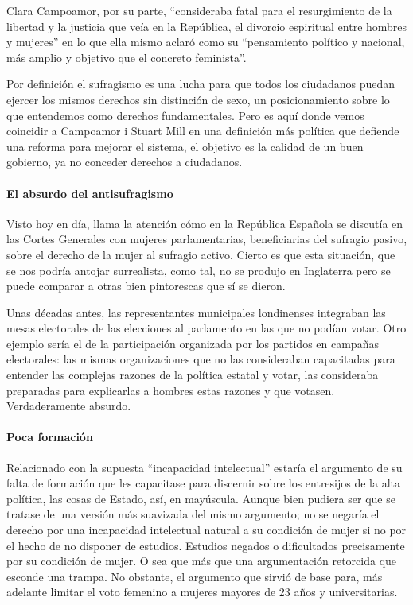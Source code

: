 \documentclass[
]{article}
\begin{document}
Clara Campoamor, por su parte, ``consideraba fatal para el resurgimiento
de la libertad y la justicia que veía en la República, el divorcio
espiritual entre hombres y mujeres'' en lo que ella mismo aclaró como su
``pensamiento político y nacional, más amplio y objetivo que el concreto
feminista''.

Por definición el sufragismo es una lucha para que todos los ciudadanos
puedan ejercer los mismos derechos sin distinción de sexo, un
posicionamiento sobre lo que entendemos como derechos fundamentales.
Pero es aquí donde vemos coincidir a Campoamor i Stuart Mill en una
definición más política que defiende una reforma para mejorar el
sistema, el objetivo es la calidad de un buen gobierno, ya no conceder
derechos a ciudadanos.

\hypertarget{el-absurdo-del-antisufragismo}{%
\paragraph{El absurdo del
antisufragismo}\label{el-absurdo-del-antisufragismo}}

Visto hoy en día, llama la atención cómo en la República Española se
discutía en las Cortes Generales con mujeres parlamentarias,
beneficiarias del sufragio pasivo, sobre el derecho de la mujer al
sufragio activo. Cierto es que esta situación, que se nos podría antojar
surrealista, como tal, no se produjo en Inglaterra pero se puede
comparar a otras bien pintorescas que sí se dieron.

Unas décadas antes, las representantes municipales londinenses
integraban las mesas electorales de las elecciones al parlamento en las
que no podían votar. Otro ejemplo sería el de la participación
organizada por los partidos en campañas electorales: las mismas
organizaciones que no las consideraban capacitadas para entender las
complejas razones de la política estatal y votar, las consideraba
preparadas para explicarlas a hombres estas razones y que votasen.
Verdaderamente absurdo.

\hypertarget{poca-formaciuxf3n}{%
\paragraph{Poca formación}\label{poca-formaciuxf3n}}

Relacionado con la supuesta ``incapacidad intelectual'' estaría el
argumento de su falta de formación que les capacitase para discernir
sobre los entresijos de la alta política, las cosas de Estado, así, en
mayúscula. Aunque bien pudiera ser que se tratase de una versión más
suavizada del mismo argumento; no se negaría el derecho por una
incapacidad intelectual natural a su condición de mujer si no por el
hecho de no disponer de estudios. Estudios negados o dificultados
precisamente por su condición de mujer. O sea que más que una
argumentación retorcida que esconde una trampa. No obstante, el
argumento que sirvió de base para, más adelante limitar el voto femenino
a mujeres mayores de 23 años y universitarias.
\end{document}
